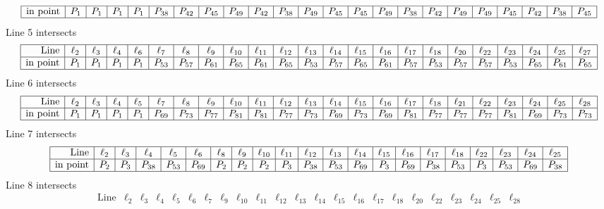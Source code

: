 \documentclass{article}
\begin{document}
{$$\begin{array}{|r*{22}{|c}|}
\hline
\mbox{in point}  & P_{1} & P_{1} & P_{1} & P_{1} & P_{38} & P_{42} & P_{45} & P_{49} & P_{42} & P_{38} & P_{49} & P_{45} & P_{45} & P_{49} & P_{38} & P_{42} & P_{49} & P_{49} & P_{45} & P_{42} & P_{38} & P_{45}\\
\hline
\end{array}
$$
Line 5 intersects 
$$
\begin{array}{|r*{22}{|c}|}
\hline
\mbox{Line}  & \ell_{2} & \ell_{3} & \ell_{4} & \ell_{6} & \ell_{7} & \ell_{8} & \ell_{9} & \ell_{10} & \ell_{11} & \ell_{12} & \ell_{13} & \ell_{14} & \ell_{15} & \ell_{16} & \ell_{17} & \ell_{18} & \ell_{20} & \ell_{22} & \ell_{23} & \ell_{24} & \ell_{25} & \ell_{27}\\
\hline
\mbox{in point}  & P_{1} & P_{1} & P_{1} & P_{1} & P_{53} & P_{57} & P_{61} & P_{65} & P_{61} & P_{65} & P_{53} & P_{57} & P_{65} & P_{61} & P_{57} & P_{53} & P_{57} & P_{57} & P_{53} & P_{65} & P_{61} & P_{65}\\
\hline
\end{array}
$$
Line 6 intersects 
$$
\begin{array}{|r*{22}{|c}|}
\hline
\mbox{Line}  & \ell_{2} & \ell_{3} & \ell_{4} & \ell_{5} & \ell_{7} & \ell_{8} & \ell_{9} & \ell_{10} & \ell_{11} & \ell_{12} & \ell_{13} & \ell_{14} & \ell_{15} & \ell_{16} & \ell_{17} & \ell_{18} & \ell_{21} & \ell_{22} & \ell_{23} & \ell_{24} & \ell_{25} & \ell_{28}\\
\hline
\mbox{in point}  & P_{1} & P_{1} & P_{1} & P_{1} & P_{69} & P_{73} & P_{77} & P_{81} & P_{81} & P_{77} & P_{73} & P_{69} & P_{73} & P_{69} & P_{81} & P_{77} & P_{77} & P_{77} & P_{81} & P_{69} & P_{73} & P_{73}\\
\hline
\end{array}
$$
Line 7 intersects 
$$
\begin{array}{|r*{20}{|c}|}
\hline
\mbox{Line}  & \ell_{2} & \ell_{3} & \ell_{4} & \ell_{5} & \ell_{6} & \ell_{8} & \ell_{9} & \ell_{10} & \ell_{11} & \ell_{12} & \ell_{13} & \ell_{14} & \ell_{15} & \ell_{16} & \ell_{17} & \ell_{18} & \ell_{22} & \ell_{23} & \ell_{24} & \ell_{25}\\
\hline
\mbox{in point}  & P_{2} & P_{3} & P_{38} & P_{53} & P_{69} & P_{2} & P_{2} & P_{2} & P_{3} & P_{38} & P_{53} & P_{69} & P_{3} & P_{69} & P_{38} & P_{53} & P_{3} & P_{53} & P_{69} & P_{38}\\
\hline
\end{array}
$$
Line 8 intersects 
$$
\begin{array}{|r*{22}{|c}|}
\hline
\mbox{Line}  & \ell_{2} & \ell_{3} & \ell_{4} & \ell_{5} & \ell_{6} & \ell_{7} & \ell_{9} & \ell_{10} & \ell_{11} & \ell_{12} & \ell_{13} & \ell_{14} & \ell_{15} & \ell_{16} & \ell_{17} & \ell_{18} & \ell_{20} & \ell_{22} & \ell_{23} & \ell_{24} & \ell_{25} & \ell_{28}\\

\end{array}$$}
\end{document}
